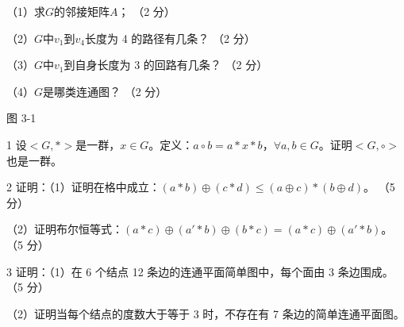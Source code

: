 \documentclass[fontset=exam]{exam-zh}
\begin{document}
（1）求\(G\)的邻接矩阵\(A\)； （2 分）

（2）\(G\)中\(v_{1}\)到\(v_{4}\)长度为 4 的路径有几条？ （2 分）

（3）\(G\)中\(v_{1}\)到自身长度为 3 的回路有几条？ （2 分）

（4）\(G\)是哪类连通图？ （2 分）

图 3-1


\par{}\smallskip

1 设\(< G,* >\)是一群，\(x \in G\)。定义：\(a \circ b = a*x*b\)，\(\forall a,b \in G\)。证明\(< G, \circ >\)也是一群。

2 证明：（1）证明在格中成立：\((a*b) \oplus (c*d) \leq (a \oplus c)*(b \oplus d)\)。 （5 分）

（2）证明布尔恒等式：\((a*c) \oplus (a'*b) \oplus (b*c) = (a*c) \oplus (a'*b)\)。 （5 分）

3 证明：（1）在 6 个结点 12 条边的连通平面简单图中，每个面由 3 条边围成。 （5 分）

（2）证明当每个结点的度数大于等于 3 时，不存在有 7 条边的简单连通平面图。
\end{document}
